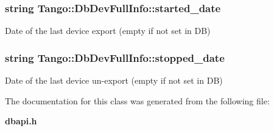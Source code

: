\subsubsection[{started\-\_\-date}]{\setlength{\rightskip}{0pt plus 5cm}string Tango\-::\-Db\-Dev\-Full\-Info\-::started\-\_\-date}\label{classTango_1_1DbDevFullInfo_aadfba1d0368c960d7f29997c6397f46e}


Date of the last device export (empty if not set in D\-B) 

\subsubsection[{stopped\-\_\-date}]{\setlength{\rightskip}{0pt plus 5cm}string Tango\-::\-Db\-Dev\-Full\-Info\-::stopped\-\_\-date}\label{classTango_1_1DbDevFullInfo_a08478bed60290351915a3d7f068389a3}


Date of the last device un-\/export (empty if not set in D\-B) 



The documentation for this class was generated from the following file\-:\begin{DoxyCompactItemize}
\item 
{\bf dbapi.\-h}\end{DoxyCompactItemize}
